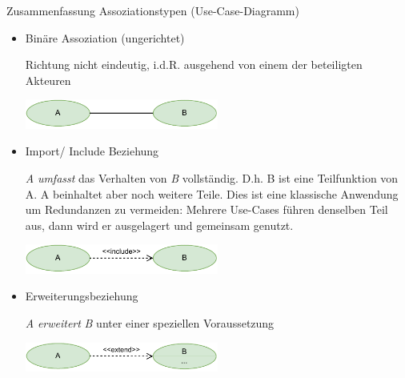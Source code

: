 \begin{defi}{Zusammenfassung Assoziationstypen (Use-Case-Diagramm)}
    \begin{itemize}
        \item Binäre Assoziation (ungerichtet)

              Richtung nicht eindeutig, i.d.R. ausgehend von einem der beteiligten Akteuren

              \vspace{1em}
              \begin{center}
                  \includegraphics[width=0.5\textwidth]{includes/figures/defi_diagrams_use_case_assoziation.pdf}
              \end{center}

        \item Import/ Include Beziehung

              \emph{A} \emph{umfasst} das Verhalten von \emph{B} vollständig.
              D.h. B ist eine Teilfunktion von A.
              A beinhaltet aber noch weitere Teile.
              Dies ist eine klassische Anwendung um Redundanzen zu vermeiden:
              Mehrere Use-Cases führen denselben Teil aus, dann wird er ausgelagert und gemeinsam genutzt.

              \vspace{1em}
              \begin{center}
                  \includegraphics[width=0.5\textwidth]{includes/figures/defi_diagrams_use_case_include.pdf}
              \end{center}

        \item Erweiterungsbeziehung

              \emph{A} \emph{erweitert} \emph{B} unter einer speziellen Voraussetzung

              \vspace{1em}
              \begin{center}
                  \includegraphics[width=0.5\textwidth]{includes/figures/defi_diagrams_use_case_extend.pdf}
              \end{center}


\end{itemize}
\end{defi}
